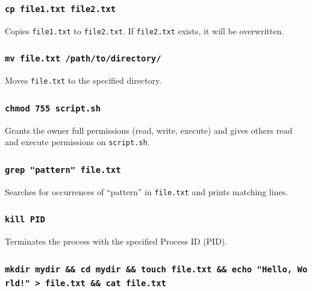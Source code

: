 \subsubsection{\texorpdfstring{\texttt{cp\ file1.txt\ file2.txt}}{cp file1.txt file2.txt}}\label{cp-file1.txt-file2.txt}

Copies \texttt{file1.txt} to \texttt{file2.txt}. If \texttt{file2.txt}
exists, it will be overwritten.

\subsubsection{\texorpdfstring{\texttt{mv\ file.txt\ /path/to/directory/}}{mv file.txt /path/to/directory/}}\label{mv-file.txt-pathtodirectory}

Moves \texttt{file.txt} to the specified directory.

\subsubsection{\texorpdfstring{\texttt{chmod\ 755\ script.sh}}{chmod 755 script.sh}}\label{chmod-755-script.sh}

Grants the owner full permissions (read, write, execute) and gives
others read and execute permissions on \texttt{script.sh}.

\subsubsection{\texorpdfstring{\texttt{grep\ "pattern"\ file.txt}}{grep "pattern" file.txt}}\label{grep-pattern-file.txt}

Searches for occurrences of ``pattern'' in \texttt{file.txt} and prints
matching lines.

\subsubsection{\texorpdfstring{\texttt{kill\ PID}}{kill PID}}\label{kill-pid}

Terminates the process with the specified Process ID (PID).

\subsubsection{\texorpdfstring{\texttt{mkdir\ mydir\ \&\&\ cd\ mydir\ \&\&\ touch\ file.txt\ \&\&\ echo\ "Hello,\ World!"\ \textgreater{}\ file.txt\ \&\&\ cat\ file.txt}}{mkdir mydir \&\& cd mydir \&\& touch file.txt \&\& echo "Hello, World!" \textgreater{} file.txt \&\& cat file.txt}}\label{mkdir-mydir-cd-mydir-touch-file.txt-echo-hello-world-file.txt-cat-file.txt}

